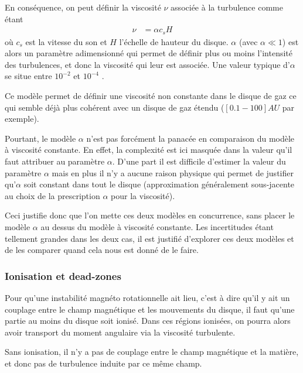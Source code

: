 \bigskip

En conséquence, on peut définir la viscosité $\nu$ associée à la turbulence comme étant 
\begin{align}
\nu &= \alpha c_s H
\end{align}
où $c_s$ est la vitesse du son et $H$ l'échelle de hauteur du disque. $\alpha$ (avec $\alpha \ll 1$) est alors un paramètre adimensionné qui permet de définir plus ou moins l'intensité des turbulences, et donc la viscosité qui leur est associée. Une valeur typique d'$\alpha$ se situe entre $10^{-2}$ et $10^{-4}$ \citep{guilloteau2011dual}.

Ce modèle permet de définir une viscosité non constante dans le disque de gaz ce qui semble déjà plus cohérent avec un disque de gaz étendu ($[0.1-100]\unit{AU}$ par exemple). 

Pourtant, le modèle $\alpha$ n'est pas forcément la panacée en comparaison du modèle à viscosité constante. En effet, la complexité est ici masquée dans la valeur qu'il faut attribuer au paramètre $\alpha$. D'une part il est difficile d'estimer la valeur du paramètre $\alpha$ mais en plus il n'y a aucune raison physique qui permet de justifier qu'$\alpha$ soit constant dans tout le disque (approximation généralement sous-jacente au choix de la prescription $\alpha$ pour la viscosité).

Ceci justifie donc que l'on mette ces deux modèles en concurrence, sans placer le modèle $\alpha$ au dessus du modèle à viscosité constante. Les incertitudes étant tellement grandes dans les deux cas, il est justifié d'explorer ces deux modèles et de les comparer quand cela nous est donné de le faire.


\subsubsection{Ionisation et dead-zones}
Pour qu'une instabilité magnéto rotationnelle ait lieu, c'est à dire qu'il y ait un couplage entre le champ magnétique et les mouvements du disque, il faut qu'une partie au moins du disque soit ionisé. Dans ces régions ionisées, on pourra alors avoir transport du moment angulaire via la viscosité turbulente. 

\bigskip

Sans ionisation, il n'y a pas de couplage entre le champ magnétique et la matière, et donc pas de turbulence induite par ce même champ. 

